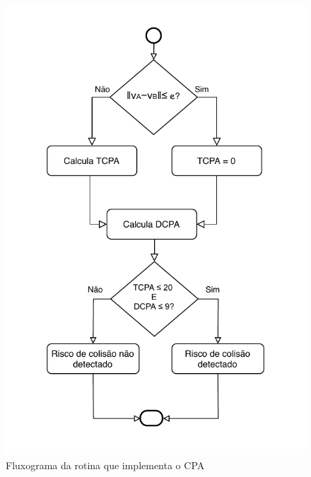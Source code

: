     \begin{figure}[H]
        \centering
        \includegraphics{fig/chap4/fluxograma_cpa.pdf}
        \caption{Fluxograma da rotina que implementa o CPA}
        \label{fig:chap4_fluxograma_cpa}
    \end{figure}
    
    
    
